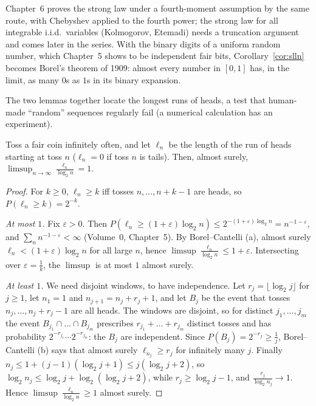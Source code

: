 Chapter~6 proves the strong law under a fourth-moment assumption by the same route, with Chebyshev applied to
the fourth power; the strong law for all integrable i.i.d.\ variables (Kolmogorov, Etemadi) needs a truncation
argument and comes later in the series. With the binary digits of a uniform random number, which Chapter~5 shows to
be independent fair bits, Corollary~\ref{cor:slln} becomes Borel's theorem of 1909: almost every number in $[0,1]$
has, in the limit, as many $0$s as $1$s in its binary expansion.

The two lemmas together locate the longest runs of heads, a test that human-made ``random'' sequences
regularly fail (a numerical calculation has an experiment).

\begin{proposition}\label{prop:runs}
Toss a fair coin infinitely often, and let $\ell_n$ be the length of the run of heads starting at toss $n$ ($\ell_n=0$ if
toss $n$ is tails). Then, almost surely, $\displaystyle\limsup_{n\to\infty}\frac{\ell_n}{\log_2n}=1$.
\end{proposition}
\begin{proof}
For $k\ge0$, $\ell_n\ge k$ iff tosses $n,\dots,n+k-1$ are heads, so $P(\ell_n\ge k)=2^{-k}$.

\emph{At most $1$.} Fix $\varepsilon>0$. Then $P(\ell_n\ge(1+\varepsilon)\log_2n)\le2^{-(1+\varepsilon)\log_2n}=n^{-1-\varepsilon}$, and $\sum_nn^{-1-\varepsilon}<\infty$ (Volume~0,
Chapter~5). By Borel--Cantelli (a), almost surely $\ell_n<(1+\varepsilon)\log_2n$ for all large $n$, hence $\limsup\frac{\ell_n}{\log_2n}\le1+\varepsilon$.
Intersecting over $\varepsilon=\frac1k$, the $\limsup$ is at most $1$ almost surely.

\emph{At least $1$.} We need disjoint windows, to have independence. Let $r_j=\lfloor\log_2j\rfloor$ for $j\ge1$, let $n_1=1$ and
$n_{j+1}=n_j+r_j+1$, and let $B_j$ be the event that tosses $n_j,\dots,n_j+r_j-1$ are all heads. The windows are disjoint, so for
distinct $j_1,\dots,j_m$ the event $B_{j_1}\cap\dots\cap B_{j_m}$ prescribes $r_{j_1}+\dots+r_{j_m}$ distinct tosses and has probability
$2^{-r_{j_1}}\cdots2^{-r_{j_m}}$: the $B_j$ are independent. Since $P(B_j)=2^{-r_j}\ge\frac1j$, Borel--Cantelli (b) says that almost surely
$\ell_{n_j}\ge r_j$ for infinitely many $j$. Finally $n_j\le1+(j-1)(\log_2j+1)\le j(\log_2j+2)$, so $\log_2n_j\le\log_2j+\log_2(\log_2j+2)$, while $r_j\ge\log_2j-1$, and
$\frac{r_j}{\log_2n_j}\to1$. Hence $\limsup\frac{\ell_n}{\log_2n}\ge1$ almost surely.
\end{proof}

